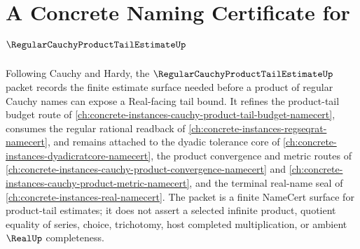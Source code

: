 \chapter{A Concrete Naming Certificate for $\RegularCauchyProductTailEstimateUp$}
\label{ch:concrete-instances-regular-cauchy-product-tail-estimate-namecert}

Following Cauchy and Hardy, the $\RegularCauchyProductTailEstimateUp$ packet records the finite estimate surface needed before a product of regular Cauchy names can expose a Real-facing tail bound. It refines the product-tail budget route of \autoref{ch:concrete-instances-cauchy-product-tail-budget-namecert}, consumes the regular rational readback of \autoref{ch:concrete-instances-regseqrat-namecert}, and remains attached to the dyadic tolerance core of \autoref{ch:concrete-instances-dyadicratcore-namecert}, the product convergence and metric routes of \autoref{ch:concrete-instances-cauchy-product-convergence-namecert} and \autoref{ch:concrete-instances-cauchy-product-metric-namecert}, and the terminal real-name seal of \autoref{ch:concrete-instances-real-namecert}. The packet is a finite NameCert surface for product-tail estimates; it does not assert a selected infinite product, quotient equality of series, choice, trichotomy, host completed multiplication, or ambient $\RealUp$ completeness.

